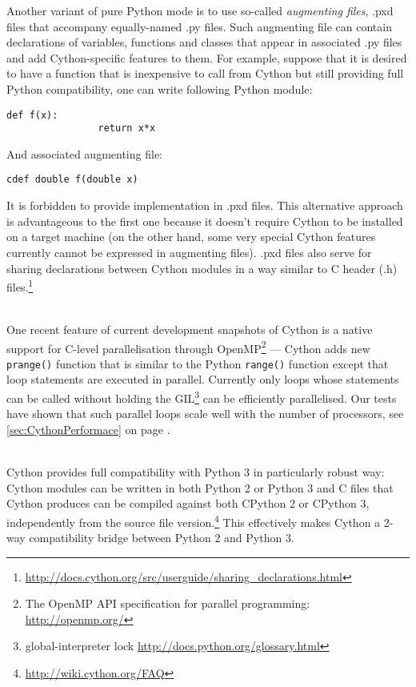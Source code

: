 \begin{description}
		Another variant of pure Python mode is to use so-called \emph{augmenting files}, .pxd files
		that accompany equally-named .py files. Such augmenting file can contain declarations of
		variables, functions and classes that appear in associated .py files and add Cython-specific
		features to them. For example, suppose that it is desired to have a function that is
		inexpensive to call from Cython but still providing full Python compatibility, one can write
		following Python module:
		\vspace*{4pt} %
		\begin{Verbatim}[samepage=true,gobble=3,label=module.py,frame=single]
			def f(x):
			    return x*x
		\end{Verbatim}
		And associated augmenting file:
		\vspace*{4pt} %
		\begin{Verbatim}[samepage=true,gobble=3,label=module.pxd,frame=single]
			cdef double f(double x)
		\end{Verbatim}
		It is forbidden to provide implementation in .pxd files. This alternative approach is
		advantageous to the first one because it doesn't require Cython to be installed on a target
		machine (on the other hand, some very special Cython features currently cannot be expressed
		in augmenting files). .pxd files also serve for sharing declarations between Cython modules
		in a way similar to C header (.h)
		files.\footnote{\url{http://docs.cython.org/src/userguide/sharing_declarations.html}}
	\item[parallelisation] \hfill \\
		One recent feature of current development snapshots of Cython is a native support for C-level
		parallelisation through OpenMP\footnote{The OpenMP API specification for parallel
		programming: \url{http://openmp.org/}} --- Cython adds new \verb|prange()| function that is
		similar to the Python \verb|range()| function except that loop statements are executed in
		parallel. Currently only loops whose statements can be called without holding the
		GIL\footnote{global-interpreter lock \url{http://docs.python.org/glossary.html}} can be
		efficiently parallelised. Our tests have shown that such parallel loops scale well with the
		number of processors, see \autoref{sec:CythonPerformace} on page \pageref{sec:CythonPerformace}.
	\item[Python 3 compatibility] \hfill \\
		Cython provides full compatibility with Python 3 in particularly robust way: Cython modules
		can be written in both Python 2 or Python 3 and C files that Cython produces can be compiled
		against both CPython 2 or CPython 3, independently from the source file
		version.\footnote{\url{http://wiki.cython.org/FAQ}}
		This effectively makes Cython a 2-way compatibility bridge between Python 2 and Python 3.
\end{description}
